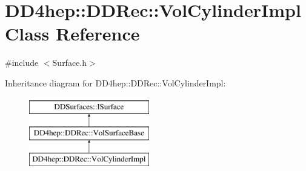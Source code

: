 \hypertarget{class_d_d4hep_1_1_d_d_rec_1_1_vol_cylinder_impl}{}\section{D\+D4hep\+:\+:D\+D\+Rec\+:\+:Vol\+Cylinder\+Impl Class Reference}
\label{class_d_d4hep_1_1_d_d_rec_1_1_vol_cylinder_impl}


{\ttfamily \#include $<$Surface.\+h$>$}

Inheritance diagram for D\+D4hep\+:\+:D\+D\+Rec\+:\+:Vol\+Cylinder\+Impl\+:\begin{figure}[H]
\begin{center}
\leavevmode
\includegraphics[height=3.000000cm]{class_d_d4hep_1_1_d_d_rec_1_1_vol_cylinder_impl}
\end{center}
\end{figure}
